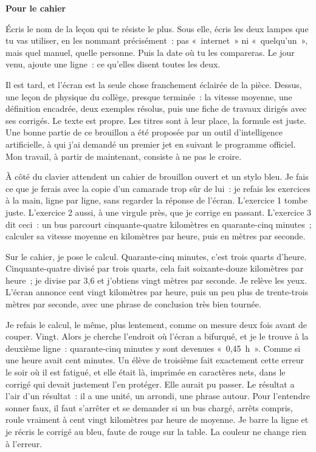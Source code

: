 \documentclass[10.5pt,twoside,openright]{book}
\newenvironment{pourcahier}[1]{\par\vspace{0.9em}\begin{tcolorbox}[colback=black!4,colframe=accent,boxrule=0pt,leftrule=2.2pt,arc=0pt,left=8pt,right=8pt,top=5pt,bottom=5pt]\small\textbf{#1}\par\smallskip}{\end{tcolorbox}\par}
\newcommand{\chapitre}[2]{\cleardoublepage\markright{#2}\thispagestyle{plain}\vspace*{2.2cm}{\noindent\color{accent}\fontsize{54}{54}\selectfont\bfseries #1}\par\vspace{0.5em}{\noindent\LARGE\bfseries #2\par}\vspace{1.6em}\noindent\ignorespaces}
\begin{document}
\begin{pourcahier}{Pour le cahier}
Écris le nom de la leçon qui te résiste le plus. Sous elle, écris les deux lampes que tu vas utiliser, en les nommant précisément : pas « internet » ni « quelqu’un », mais quel manuel, quelle personne. Puis la date où tu les compareras. Le jour venu, ajoute une ligne : ce qu’elles disent toutes les deux.
\end{pourcahier}


\chapitre{14}{Atelier}

Il est tard, et l’écran est la seule chose franchement éclairée de la pièce. Dessus, une leçon de physique du collège, presque terminée : la vitesse moyenne, une définition encadrée, deux exemples résolus, puis une fiche de travaux dirigés avec ses corrigés. Le texte est propre. Les titres sont à leur place, la formule est juste. Une bonne partie de ce brouillon a été proposée par un outil d’intelligence artificielle, à qui j’ai demandé un premier jet en suivant le programme officiel. Mon travail, à partir de maintenant, consiste à ne pas le croire.

À côté du clavier attendent un cahier de brouillon ouvert et un stylo bleu. Je fais ce que je ferais avec la copie d’un camarade trop sûr de lui : je refais les exercices à la main, ligne par ligne, sans regarder la réponse de l’écran. L’exercice 1 tombe juste. L’exercice 2 aussi, à une virgule près, que je corrige en passant. L’exercice 3 dit ceci : un bus parcourt cinquante-quatre kilomètres en quarante-cinq minutes ; calculer sa vitesse moyenne en kilomètres par heure, puis en mètres par seconde.

Sur le cahier, je pose le calcul. Quarante-cinq minutes, c’est trois quarts d’heure. Cinquante-quatre divisé par trois quarts, cela fait soixante-douze kilomètres par heure ; je divise par 3,6 et j’obtiens vingt mètres par seconde. Je relève les yeux. L’écran annonce cent vingt kilomètres par heure, puis un peu plus de trente-trois mètres par seconde, avec une phrase de conclusion très bien tournée.

Je refais le calcul, le même, plus lentement, comme on mesure deux fois avant de couper. Vingt. Alors je cherche l’endroit où l’écran a bifurqué, et je le trouve à la deuxième ligne : quarante-cinq minutes y sont devenues « 0,45 h ». Comme si une heure avait cent minutes. Un élève de troisième fait exactement cette erreur le soir où il est fatigué, et elle était là, imprimée en caractères nets, dans le corrigé qui devait justement l’en protéger. Elle aurait pu passer. Le résultat a l’air d’un résultat : il a une unité, un arrondi, une phrase autour. Pour l’entendre sonner faux, il faut s’arrêter et se demander si un bus chargé, arrêts compris, roule vraiment à cent vingt kilomètres par heure de moyenne. Je barre la ligne et je récris le corrigé au bleu, faute de rouge sur la table. La couleur ne change rien à l’erreur.
\end{document}
